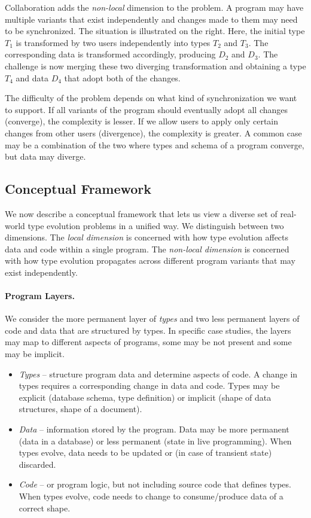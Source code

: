 \documentclass[english,submission]{programming}
\begin{document}
Collaboration adds the \emph{non-local} dimension to the problem. A program may have multiple
variants that exist independently and changes made to them may need to be synchronized. The
situation is illustrated on the right. Here, the initial type $T_1$ is transformed by two
users independently into types $T_2$ and $T_3$. The corresponding data is transformed accordingly,
producing $D_2$ and $D_3$. The challenge is now merging these two diverging transformation and
obtaining a type $T_4$ and data $D_4$ that adopt both of the changes.

The difficulty of the problem depends on what kind of synchronization we want to support.
If all variants of the program should eventually adopt all changes (converge), the complexity
is lesser. If we allow users to apply only certain changes from other users (divergence), the
complexity is greater. A common case may be a combination of the two where types and schema
of a program converge, but data may diverge.

\subsection{Conceptual Framework}

We now describe a conceptual framework that lets us view a diverse set of real-world
type evolution problems in a unified way. We distinguish between two dimensions.
The \emph{local dimension} is concerned with how type evolution affects data and code within
a single program. The \emph{non-local dimension} is concerned with how type evolution
propagates across different program variants that may exist independently.

\paragraph{Program Layers.}
We consider the more permanent layer of \emph{types} and two less permanent layers of code and
data that are structured by types. In specific case studies, the layers may map to
different aspects of programs, some may be not present and some may be implicit.

\begin{itemize}
\item \emph{Types} -- structure program data and determine aspects of code. A change in types
  requires a corresponding change in data and code. Types may be explicit (database schema, type definition)
  or implicit (shape of data structures, shape of a document).
\item \emph{Data} -- information stored by the program. Data may be more permanent (data in a
  database) or less permanent (state in live programming). When types evolve, data needs to be
  updated or (in case of transient state) discarded.
\item \emph{Code} -- or program logic, but not including source code that defines types.
  When types evolve, code needs to change to consume/produce data of a correct shape.
\end{itemize}
\end{document}
